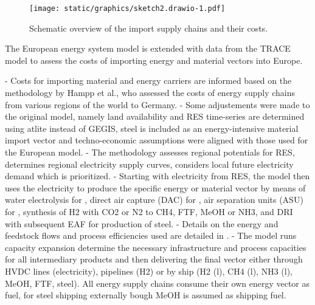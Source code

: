 \begin{figure*}
    \centering
    \texttt{[image: static/graphics/sketch2.drawio-1.pdf]}
    \caption{Schematic overview of the import supply chains and their costs.}
    \label{fig:import-esc-scheme}
\end{figure*}

The European energy system model is extended with data from the TRACE model \cite{hamppImportOptions2023} to assess the costs of importing energy and material vectors into Europe.

- Costs for importing material and energy carriers are informed based on the methodology by Hampp et al.\cite{hamppImportOptions2023}, who assessed the costs of energy supply chains from various regions of the world to Germany.
- Some adjustements were made to the original model, namely land availability and RES time-series are determined using atlite\cite{hofmannAtliteLightweight2021b} instead of GEGIS\cite{mattssonAutopilotEnergy2021}, steel is included as an energy-intensive material import vector and techno-economic assumptions were aligned with those used for the European model.
- The methodology assesses regional potentials for RES, determines regional electricity supply curves, considers local future electricity demand which is prioritized.
- Starting with electricity from RES, the model then uses the electricity to produce the specific energy or material vector by means of water electrolysis for , direct air capture (DAC) for , air separation units (ASU) for , synthesis of H2 with CO2 or N2 to CH4, FTF, MeOH or NH3, and DRI with subsequent EAF for production of steel.
- Details on the energy and feedstock flows and process efficiencies used are detailed in .
- The model runs capacity expansion determine the necessary infrastructure and process capacities for all intermediary products and then delivering the final vector either through HVDC lines (electricity), pipelines (H2) or by ship (H2 (l), CH4 (l), NH3 (l), MeOH, FTF, steel).
All energy supply chains consume their own energy vector as fuel, for steel shipping externally bough MeOH is assumed as shipping fuel.

